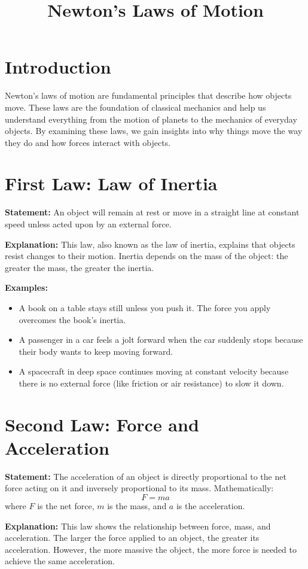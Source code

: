 \documentclass[12pt]{article}
\title{Newton's Laws of Motion}
\author{}
\date{}
\begin{document}
\maketitle

\section*{Introduction}
Newton's laws of motion are fundamental principles that describe how objects move. These laws are the foundation of classical mechanics and help us understand everything from the motion of planets to the mechanics of everyday objects. By examining these laws, we gain insights into why things move the way they do and how forces interact with objects.

\section*{First Law: Law of Inertia}
\textbf{Statement:} An object will remain at rest or move in a straight line at constant speed unless acted upon by an external force.

\textbf{Explanation:} This law, also known as the law of inertia, explains that objects resist changes to their motion. Inertia depends on the mass of the object: the greater the mass, the greater the inertia.

\textbf{Examples:}
\begin{itemize}
    \item A book on a table stays still unless you push it. The force you apply overcomes the book's inertia.
    \item A passenger in a car feels a jolt forward when the car suddenly stops because their body wants to keep moving forward.
    \item A spacecraft in deep space continues moving at constant velocity because there is no external force (like friction or air resistance) to slow it down.
\end{itemize}

\section*{Second Law: Force and Acceleration}
\textbf{Statement:} The acceleration of an object is directly proportional to the net force acting on it and inversely proportional to its mass. Mathematically:
\[ F = ma \]
where $F$ is the net force, $m$ is the mass, and $a$ is the acceleration.

\textbf{Explanation:} This law shows the relationship between force, mass, and acceleration. The larger the force applied to an object, the greater its acceleration. However, the more massive the object, the more force is needed to achieve the same acceleration.
\end{document}
